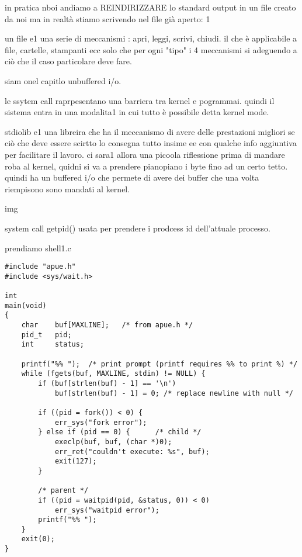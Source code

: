 in pratica nboi andiamo a REINDIRIZZARE lo standard output in un file creato da noi ma in realtà stiamo scrivendo nel file già aperto: 1



un file e1 una serie di meccanismi : apri, leggi, scrivi, chiudi. il che è applicabile a file, cartelle, stampanti ecc solo che per ogni "tipo" i 4 meccanismi si adeguendo a ciò che il caso particolare deve fare.


siam onel capitlo unbuffered i/o.


le ssytem call raprpesentano una barriera tra kernel e pogrammai. quindi il sistema entra in una modalita1 in cui tutto è possibile detta kernel mode.


stdiolib e1 una libreira che ha il meccanismo di avere delle prestazioni migliori se ciò che deve essere scirtto lo consegna tutto insime ee con qualche info aggiuntiva per facilitare il lavoro. ci sara1 allora una picoola riflessione prima di mandare roba al kernel, quidni si va a prendere pianopiano i byte fino ad un certo tetto. quindi ha un buffered i/o che permete di avere dei buffer che una volta riempisono sono mandati al kernel.

img 





system call getpid() usata per prendere i prodcess id dell'attuale processo.







prendiamo shell1.c

\begin{lstlisting}
#include "apue.h"
#include <sys/wait.h>

int
main(void)
{
	char	buf[MAXLINE];	/* from apue.h */
	pid_t	pid;
	int		status;

	printf("%% ");	/* print prompt (printf requires %% to print %) */
	while (fgets(buf, MAXLINE, stdin) != NULL) {
		if (buf[strlen(buf) - 1] == '\n')
			buf[strlen(buf) - 1] = 0; /* replace newline with null */

		if ((pid = fork()) < 0) {
			err_sys("fork error");
		} else if (pid == 0) {		/* child */
			execlp(buf, buf, (char *)0);
			err_ret("couldn't execute: %s", buf);
			exit(127);
		}

		/* parent */
		if ((pid = waitpid(pid, &status, 0)) < 0)
			err_sys("waitpid error");
		printf("%% ");
	}
	exit(0);
}
\end{lstlisting}



